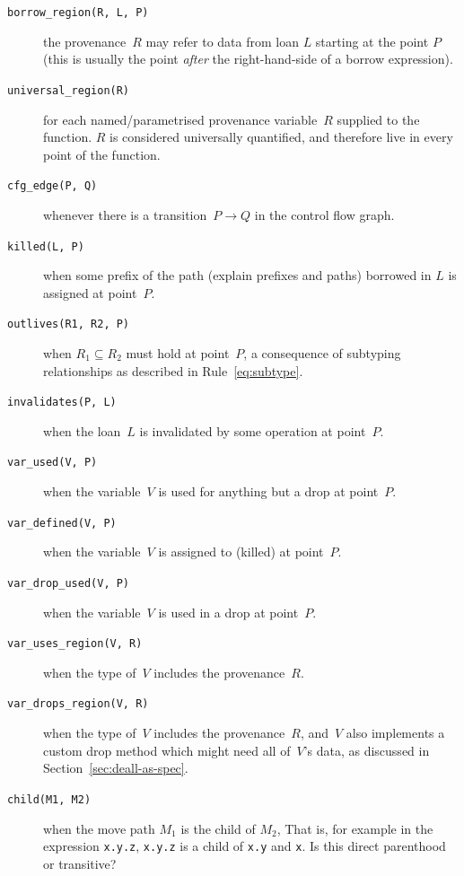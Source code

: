 \documentclass[11pt,a4paper,twoside,openany]{report}
\newcommand{\fixme}[1] {{\color{red}#1}}
\newcommand{\InRust}[1]{\texttt{#1}}
\newcommand{\InDatalog}[1]{\texttt{#1}}
\begin{document}
\begin{description}
\item[\InDatalog{borrow_region(R, L, P)}] the provenance~$R$ may refer
  to data from loan $L$ starting at the point $P$ (this is usually the point
  \emph{after} the right-hand-side of a borrow expression).
  
\item[\InDatalog{universal_region(R)}] for each named/parametrised provenance
  variable~$R$ supplied to the function. $R$ is considered universally
  quantified, and therefore live in every point of the function.
  
\item[\InDatalog{cfg_edge(P, Q)}] whenever there is a transition~$P \rightarrow
  Q$ in the control flow graph.
    
\item[\InDatalog{killed(L, P)}] when some prefix of the path (\fixme{explain
    prefixes and paths}) borrowed in $L$ is assigned at point~$P$.
    
\item[\InDatalog{outlives(R1, R2, P)}] when $R_1 \subseteq R_2$ must hold at
  point~$P$, a consequence of subtyping relationships as described in
  Rule~\eqref{eq:subtype}.
    
\item[\InDatalog{invalidates(P, L)}] when the loan~$L$ is invalidated by some
  operation at point~$P$.
    
\item[\InDatalog{var_used(V, P)}] when the variable~$V$ is used for anything but
  a drop at point~$P$.
    
\item[\InDatalog{var_defined(V, P)}] when the variable~$V$ is assigned to
  (killed) at point~$P$.
  
\item[\InDatalog{var_drop_used(V, P)}] when the variable~$V$ is used in a drop at point~$P$.

\item[\InDatalog{var_uses_region(V, R)}] when the type of~$V$ includes the
  provenance~$R$.

\item[\InDatalog{var_drops_region(V, R)}] when the type of~$V$ includes the
  provenance~$R$, and~$V$ also implements a custom drop method which might need
  all of~$V$'s data, as discussed in Section~\ref{sec:deall-as-spec}.

\item[\InDatalog{child(M1, M2)}] when the move path $M_1$ is the child of $M_2$,
  That is, for example in the expression \InRust{x.y.z}, \InRust{x.y.z} is a
  child of \InRust{x.y} and \InRust{x}. \fixme{Is this direct parenthood or
    transitive?}


\end{description}
\end{document}
